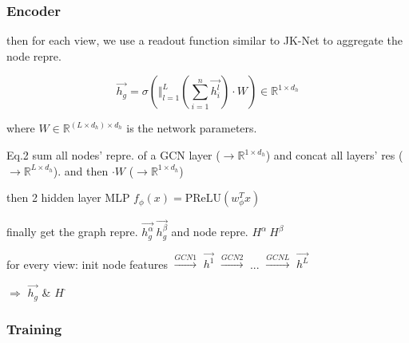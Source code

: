 \documentclass[UTF8]{beamer}
\begin{document}
    \begin{frame}
        \frametitle{Encoder}

        then for each view, we use a readout function similar to JK-Net to aggregate the node repre.
        
        \begin{equation*}
            \vec{h_g} = \sigma(\Vert_{l=1}^L(\sum_{i=1}^n\vec{h_i^l})\cdot W)\in\mathbb{R}^{1\times d_h}  \tag{2}
        \end{equation*}
        
        where \(W\in\mathbb{R}^{(L\times d_h)\times d_h}\) is the network parameters.
        \vspace{.4cm}
        
        Eq.2 sum all nodes' repre. of a GCN layer (\(\rightarrow\mathbb{R}^{1\times d_h}\)) and concat all layers' res (\(\rightarrow\mathbb{R}^{L\times d_h}\)). and then \(\cdot W\) (\(\rightarrow\mathbb{R}^{1\times d_h}\))
        \vspace{.4cm}
        
        then 2 hidden layer MLP \(f_\phi(x) = \text{PReLU}(w_\phi^Tx)\)
        \vspace{.4cm}
        
        finally get the graph repre. \(\vec{h_g^\alpha}\ \vec{h_g^\beta}\) and node repre. \(H^\alpha\ H^\beta\)
        \vspace{.4cm}
        
        for every view: init node features $\stackrel{GCN1}{\rightarrow}$ \(\vec{h^1}\) $\stackrel{GCN2}{\rightarrow}$ ... $\stackrel{GCNL}{\rightarrow}$ \(\vec{h^L}\)
        
        $\Rightarrow$ \(\vec{h_g}\) \& \(H^{\cdot}\)        
    
    \end{frame}

    \subsubsection{Training}
\end{document}

